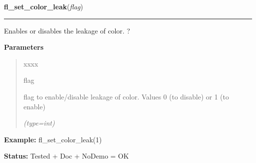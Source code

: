     \label{xformslib:flbasic:fl_set_color_leak}

    \vspace{0.5ex}

\hspace{.8\funcindent}\begin{boxedminipage}{\funcwidth}

    \raggedright \textbf{fl\_set\_color\_leak}(\textit{flag})

    \vspace{-1.5ex}

    \rule{\textwidth}{0.5\fboxrule}
\setlength{\parskip}{2ex}
    Enables or disables the leakage of color. ?

\setlength{\parskip}{1ex}
      \textbf{Parameters}
      \vspace{-1ex}

      \begin{quote}
        \begin{Ventry}{xxxx}

          \item[flag]

          flag to enable/disable leakage of color. Values 0 (to disable) or
          1 (to enable)

            {\it (type=int)}

        \end{Ventry}

      \end{quote}

\textbf{Example:} fl\_set\_color\_leak(1)



\textbf{Status:} Tested + Doc + NoDemo = OK



    \end{boxedminipage}

    \label{xformslib:flbasic:fl_getmcolor}

    \vspace{0.5ex}

